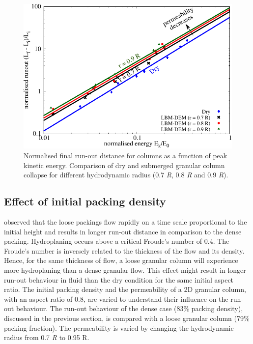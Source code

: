 \begin{landscape}
\begin{figure}
	\centering
	\includegraphics[height=0.9\textheight]{runout_fluid_dry_energy}
	\caption[Normalised final run-out distance for columns as a function of 
		peak kinetic energy in dry and submerged conditions]{Normalised final 
		run-out distance for columns as a function of 
	peak kinetic energy. Comparison of dry and submerged granular column 
	collapse for different hydrodynamic radius (0.7 \textit{R}, 0.8 \textit{R} 
	and 0.9 \textit{R}).}
	\label{fig:runout_fluid_dry_energy}
\end{figure}
\end{landscape}



\subsection{Effect of initial packing density}

\citet{Rondon2011} observed that the loose packings flow rapidly on a time
scale proportional to the initial height and results in longer run-out distance 
in comparison to the dense packing. Hydroplaning occurs above a critical 
Froude's number of 0.4. The Froude's number is inversely related to the 
thickness of the flow and its density. Hence, for the same thickness of flow, a 
loose granular column will experience more hydroplaning than a dense granular 
flow. This effect might result in longer run-out behaviour in fluid than the 
dry condition for the same initial aspect ratio. The initial packing density 
and the permeability of a 2D granular column, with an aspect ratio of 0.8, are 
varied to understand their influence on the run-out behaviour. The run-out 
behaviour of the dense case (83\% packing density), discussed in the previous 
section, is compared with a loose granular column (79\% packing fraction). The 
permeability is varied by changing the hydrodynamic radius from 0.7 \textit{R} 
to 0.95 
R. 

